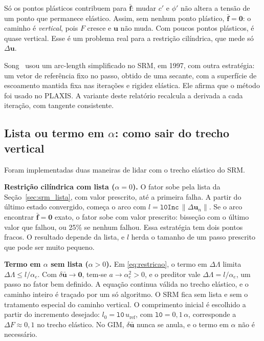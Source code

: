 \documentclass[11pt,a4paper]{article}
\numberwithin{equation}{section}
\begin{document}
Só os pontos plásticos contribuem para $\bar{\mathbf{f}}$: mudar $c'$ e $\phi'$ não altera a tensão de um ponto que permanece elástico. Assim, sem nenhum ponto plástico, $\bar{\mathbf{f}} = \mathbf{0}$: o caminho é \emph{vertical}, pois $F$ cresce e $\mathbf{u}$ não muda. Com poucos pontos plásticos, é quase vertical. Esse é um problema real para a restrição cilíndrica, que mede só $\Delta\mathbf{u}$.

Song~\cite{song1997} usou um arc-length simplificado no SRM, em 1997, com outra estratégia: um vetor de referência fixo no passo, obtido de uma secante, com a superfície de escoamento mantida fixa nas iterações e rigidez elástica. Ele afirma que o método foi usado no PLAXIS. A variante deste relatório recalcula a derivada a cada iteração, com tangente consistente.

\subsection{Lista ou termo em $\alpha$: como sair do trecho vertical}\label{sec:vertical}

Foram implementadas duas maneiras de lidar com o trecho elástico do SRM.

\textbf{Restrição cilíndrica com lista ($\alpha = 0$).} O fator sobe pela lista da Seção~\ref{sec:srm_lista}, com valor prescrito, até a primeira falha. A partir do último estado convergido, começa o arco com $l = \texttt{l0Inc}\,\|\Delta\mathbf{u}_n\|$. Se o arco encontrar $\bar{\mathbf{f}} = \mathbf{0}$ exato, o fator sobe com valor prescrito: bisseção com o último valor que falhou, ou 25\% se nenhum falhou. Essa estratégia tem dois pontos fracos. O resultado depende da lista, e $l$ herda o tamanho de um passo prescrito que pode ser muito pequeno.

\textbf{Termo em $\alpha$ sem lista ($\alpha > 0$).} Em \eqref{eq:restricao}, o termo em $\Delta\Lambda$ limita $\Delta\Lambda \le l/\alpha_e$. Com $\delta\bar{\mathbf{u}} \to \mathbf{0}$, tem-se $a \to \alpha_e^2 > 0$, e o preditor vale $\Delta\Lambda = l/\alpha_e$, um passo no fator bem definido. A equação continua válida no trecho elástico, e o caminho inteiro é traçado por um só algoritmo. O SRM fica sem lista e sem o tratamento especial do caminho vertical. O comprimento inicial é escolhido a partir do incremento desejado: $l_0 = \texttt{l0}\,u_{\mathrm{ref}}$, com $\texttt{l0} = 0{,}1\,\alpha$, corresponde a $\Delta F \approx 0{,}1$ no trecho elástico. No GIM, $\delta\bar{\mathbf{u}}$ nunca se anula, e o termo em $\alpha$ não é necessário.
\end{document}
